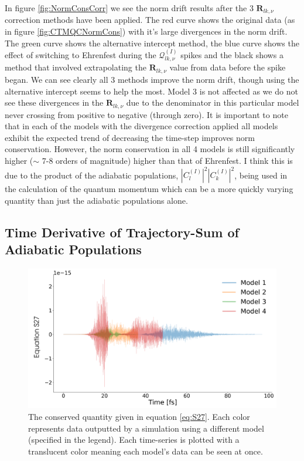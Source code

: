 In figure \ref{fig:NormConsCorr} we see the norm drift results after the 3 $\mathbf{R}_{lk, \nu}$ correction methods have been applied. The red curve shows the original data (as in figure \ref{fig:CTMQCNormCons}) with it's large divergences in the norm drift. The green curve shows the alternative intercept method, the blue curve shows the effect of switching to Ehrenfest during the $\mathcal{Q}_{lk, \nu}^{(I)}$ spikes and the black shows a method that involved extrapolating the $\mathbf{R}_{lk, \nu}$ value from data before the spike began. We can see clearly all 3 methods improve the norm drift, though using the alternative intercept seems to help the most. Model 3 is not affected as we do not see these divergences in the $\mathbf{R}_{lk, \nu}$ due to the denominator in this particular model never crossing from positive to negative (through zero). It is important to note that in each of the models with the divergence correction applied all models exhibit the expected trend of decreasing the time-step improves norm conservation. However, the norm conservation in all 4 models is still significantly higher ($\sim$ 7-8 orders of magnitude) higher than that of Ehrenfest. I think this is due to the product of the adiabatic populations, $|C_{l}^{(I)}|^2 |C_{k}^{(I)}|^2$, being used in the calculation of the quantum momentum which can be a more quickly varying quantity than just the adiabatic populations alone.

\subsection{Time Derivative of Trajectory-Sum of Adiabatic Populations}
\begin{figure}[h]
	\includegraphics[width=\textwidth]{./img/CTMQC/TullyModels/CTMQC_S27.png}
	\caption{\label{fig:S27}The conserved quantity given in equation \eqref{eq:S27}. Each color represents data outputted by a simulation using a different model (specified in the legend). Each time-series is plotted with a translucent color meaning each model's data can be seen at once.}
\end{figure}

